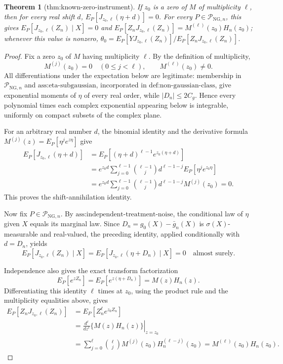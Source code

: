 \documentclass{article}
\newtheorem{theorem}{Theorem}
\begin{document}
\begin{theorem}[thm:known-zero-instrument]\label{thm:known-zero-instrument}
If \(z_0\) is a zero of \(M\) of multiplicity \(\ell\), then for every real shift \(d\), \(E_P[J_{z_0,\ell}(\eta+d)]=0\). For every \(P\in\mathcal P_{\mathrm{NG},n}\), this gives \(E_P[J_{z_0,\ell}(Z_n)\mid X]=0\) and \(E_P[Z_nJ_{z_0,\ell}(Z_n)]=M^{(\ell)}(z_0)H_n(z_0)\); whenever this value is nonzero, \(\theta_0=E_P[YJ_{z_0,\ell}(Z_n)]/E_P[Z_nJ_{z_0,\ell}(Z_n)]\).
\end{theorem}
\begin{proof}
Fix a zero \(z_0\) of \(M\) having multiplicity \(\ell\).  By the definition of multiplicity,
\[
 M^{(j)}(z_0)=0\quad(0\le j<\ell),
 \qquad M^{(\ell)}(z_0)\ne0.
\]
All differentiations under the expectation below are legitimate: membership in \(\mathcal P_{\mathrm{NG},n}\) and \(\text{ass:eta-subgaussian}\), incorporated in \(\text{def:non-gaussian-class}\), give exponential moments of \(\eta\) of every real order, while \(|D_n|\le 2C_g\).  Hence every polynomial times each complex exponential appearing below is integrable, uniformly on compact subsets of the complex plane.

For an arbitrary real number \(d\), the binomial identity and the derivative formula \(M^{(j)}(z)=E_P[\eta^j e^{z\eta}]\) give
\[
\begin{aligned}
 E_P[J_{z_0,\ell}(\eta+d)]
 &=E_P[(\eta+d)^{\ell-1}e^{z_0(\eta+d)}]\\
 &=e^{z_0d}\sum_{j=0}^{\ell-1}
   {\ell-1\choose j}d^{\ell-1-j}E_P[\eta^j e^{z_0\eta}]\\
 &=e^{z_0d}\sum_{j=0}^{\ell-1}
   {\ell-1\choose j}d^{\ell-1-j}M^{(j)}(z_0)=0.
\end{aligned}
\]
This proves the shift-annihilation identity.

Now fix \(P\in\mathcal P_{\mathrm{NG},n}\).  By \(\text{ass:independent-treatment-noise}\), the conditional law of \(\eta\) given \(X\) equals its marginal law.  Since \(D_n=g_0(X)-\bar g_n(X)\) is \(\sigma(X)\)-measurable and real-valued, the preceding identity, applied conditionally with \(d=D_n\), yields
\[
 E_P[J_{z_0,\ell}(Z_n)\mid X]
 =E_P[J_{z_0,\ell}(\eta+D_n)\mid X]=0
 \quad\text{almost surely}.
\]

Independence also gives the exact transform factorization
\[
 E_P[e^{zZ_n}]
 =E_P[e^{z(\eta+D_n)}]=M(z)H_n(z).
\]
Differentiating this identity \(\ell\) times at \(z_0\), using the product rule and the multiplicity equalities above, gives
\[
\begin{aligned}
 E_P[Z_nJ_{z_0,\ell}(Z_n)]
 &=E_P[Z_n^{\ell}e^{z_0Z_n}]\\
 &=\left.\frac{d^{\ell}}{dz^{\ell}}\{M(z)H_n(z)\}\right|_{z=z_0}\\
 &=\sum_{j=0}^{\ell}{\ell\choose j}
   M^{(j)}(z_0)H_n^{(\ell-j)}(z_0)
 =M^{(\ell)}(z_0)H_n(z_0).
\end{aligned}
\]


\end{proof}
\end{document}
